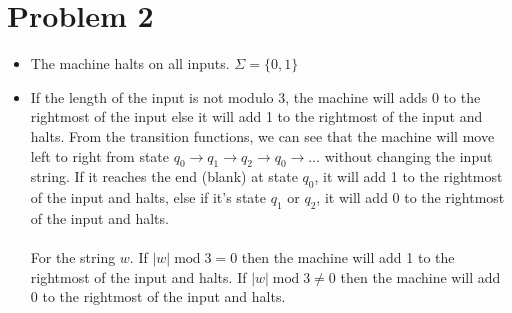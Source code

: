 \documentclass[12pt]{article}
\begin{document}
\section*{Problem 2}
\begin{itemize}
    \item The machine halts on all inputs. \(\Sigma = \{0,1\}\)
    \item If the length of the input is not modulo 3, the machine will adds 0 to the rightmost of the input else it will add 1 to the rightmost of the input and halts.
    From the transition functions, we can see that the machine will move left to right from state \(q_0 \rightarrow q_1 \rightarrow q_2 \rightarrow q_0\rightarrow \dots\) without changing the input string. If it reaches the end (blank) at state 
    \(q_0\), it will add 1 to the rightmost of the input and halts, else if it's state \(q_1\) or \(q_2\), it will add 0 to the rightmost of the input and halts.
    \\ \\
    For the string \(w\). If \(|w| \; \text{mod} \; 3 = 0\) then the machine will add 1 to the rightmost of the input and halts. If \(|w| \; \text{mod} \; 3 \neq 0\) then the machine will add 0 to the rightmost of the input and halts. 
\end{itemize}
\end{document}

